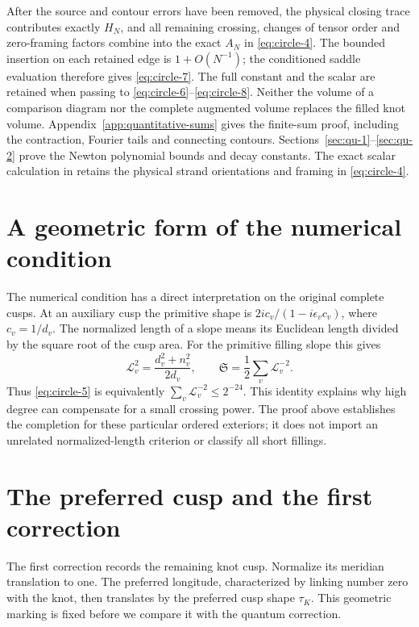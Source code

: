 After the source and contour errors have been removed, the physical
closing trace contributes exactly \(H_N\), and all
remaining crossing, changes of tensor order and zero-framing factors
combine into the exact \(A_N\) in \eqref{eq:circle-4}. The bounded insertion on each
retained edge is \(1+O(N^{-1})\); the conditioned saddle evaluation
therefore gives \eqref{eq:circle-7}. The full constant and the scalar are retained when
passing to \eqref{eq:circle-6}--\eqref{eq:circle-8}. Neither the volume of a comparison diagram nor the
complete augmented volume replaces the filled knot volume. Appendix~\ref{app:quantitative-sums} gives the finite-sum
proof, including the contraction, Fourier tails and connecting
contours. Sections~\ref{sec:qu-1}--\ref{sec:qu-2} prove the
Newton polynomial bounds and decay constants.
The exact scalar calculation in
\cite[Proposition~8.1]{MeridianTangles} retains the physical strand
orientations and framing in \eqref{eq:circle-4}.

\section{A geometric form of the numerical
condition}\label{sec:circle-a-geometric-form-of-the-numerical-condition}

The numerical condition has a direct interpretation on the original
complete cusps. At an auxiliary cusp the primitive shape is
\(2i c_v/(1-i\epsilon_v c_v)\), where \(c_v=1/d_v\). The normalized
length of a slope means its Euclidean length divided by the square root
of the cusp area. For the primitive filling slope this gives \begin{equation}
 \mathcal L_v^2=\frac{d_v^2+n_v^2}{2d_v},\qquad
                 \mathfrak S=\frac12\sum_v\mathcal L_v^{-2}.
 \label{eq:circle-20}
\end{equation} Thus \eqref{eq:circle-5} is equivalently \(\sum_v\mathcal L_v^{-2}\le2^{-24}\). This
identity explains why high degree can compensate for a small crossing
power. The proof above establishes the completion for these particular
ordered exteriors; it does not import an unrelated normalized-length
criterion or classify all short fillings.

\section{The preferred cusp and the first
correction}\label{sec:circle-the-preferred-cusp-and-the-first-correction}

The first correction records the remaining knot cusp. Normalize its
meridian translation to one. The preferred longitude, characterized
by linking number zero with the knot, then translates by the preferred
cusp shape \(\tau_K\). This geometric marking is fixed before we
compare it with the quantum correction.

